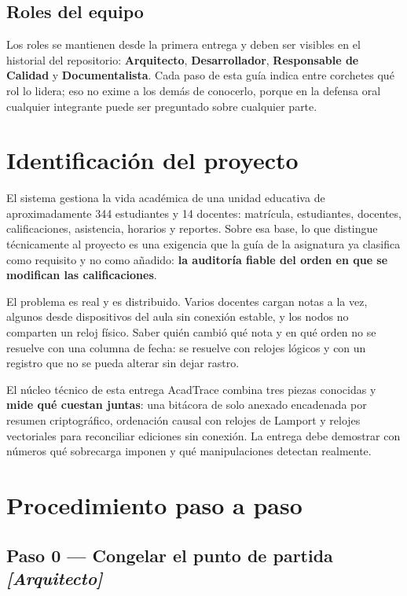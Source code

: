 \documentclass[11pt,a4paper]{article}
\newcommand{\paso}[1]{\subsection{#1}}
\begin{document}
	\subsection{Roles del equipo}
	
	Los roles se mantienen desde la primera entrega y deben ser visibles en el historial del repositorio: \textbf{Arquitecto}, \textbf{Desarrollador}, \textbf{Responsable de Calidad} y \textbf{Documentalista}. Cada paso de esta guía indica entre corchetes qué rol lo lidera; eso no exime a los demás de conocerlo, porque en la defensa oral cualquier integrante puede ser preguntado sobre cualquier parte.
	
	\section{Identificación del proyecto}
	
	El sistema gestiona la vida académica de una unidad educativa de aproximadamente 344 estudiantes y 14 docentes: matrícula, estudiantes, docentes, calificaciones, asistencia, horarios y reportes. Sobre esa base, lo que distingue técnicamente al proyecto es una exigencia que la guía de la asignatura ya clasifica como requisito y no como añadido: \textbf{la auditoría fiable del orden en que se modifican las calificaciones}.
	
	El problema es real y es distribuido. Varios docentes cargan notas a la vez, algunos desde dispositivos del aula sin conexión estable, y los nodos no comparten un reloj físico. Saber quién cambió qué nota y en qué orden no se resuelve con una columna de fecha: se resuelve con relojes lógicos y con un registro que no se pueda alterar sin dejar rastro.
	
	\begin{defBox}{El núcleo técnico de esta entrega}
		AcadTrace combina tres piezas conocidas y \textbf{mide qué cuestan juntas}: una bitácora de solo anexado encadenada por resumen criptográfico, ordenación causal con relojes de Lamport y relojes vectoriales para reconciliar ediciones sin conexión. La entrega debe demostrar con números qué sobrecarga imponen y qué manipulaciones detectan realmente.
	\end{defBox}
	
	\section{Procedimiento paso a paso}
	
	\paso{Paso 0 --- Congelar el punto de partida \emph{[Arquitecto]}}
	
\end{document}
